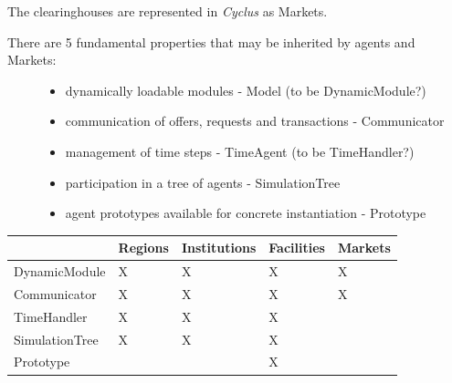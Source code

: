 \documentclass[letterpaper,10pt,english]{sphinxmanual}
\begin{document}
The clearinghouses are represented in \emph{Cyclus} as Markets.
\begin{description}
\item[{There are 5 fundamental properties that may be inherited by agents and Markets:}] \leavevmode\begin{itemize}
\item {} 
dynamically loadable modules - Model (to be DynamicModule?)

\item {} 
communication of offers, requests and transactions - Communicator

\item {} 
management of time steps - TimeAgent (to be TimeHandler?)

\item {} 
participation in a tree of agents - SimulationTree

\item {} 
agent prototypes available for concrete instantiation - Prototype

\end{itemize}

\end{description}

\begin{tabulary}{\linewidth}{|L|L|L|L|L|}
\hline
 & 
Regions
 & 
Institutions
 & 
Facilities
 & 
Markets
\\\hline

DynamicModule
 & 
X
 & 
X
 & 
X
 & 
X
\\\hline

Communicator
 & 
X
 & 
X
 & 
X
 & 
X
\\\hline

TimeHandler
 & 
X
 & 
X
 & 
X
 & \\\hline

SimulationTree
 & 
X
 & 
X
 & 
X
 & \\\hline

Prototype
 &  &  & 
X
 & \\\hline
\end{tabulary}
\end{document}

